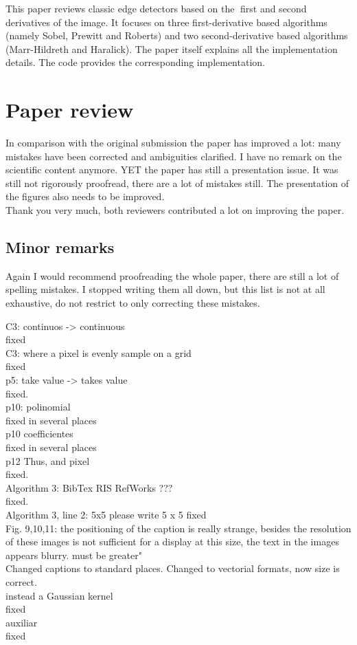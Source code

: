 \documentclass[a4paper,10pt]{report}
\begin{document}
\que This paper reviews classic edge detectors based on the first and second derivatives of the image. It focuses
on three first-derivative based algorithms (namely Sobel, Prewitt and Roberts) and two second-derivative
based algorithms (Marr-Hildreth and Haralick). The paper itself explains all the implementation details.
The code provides the corresponding implementation.\\

\section{Paper review}

\que In comparison with the original submission the paper has improved a lot: many mistakes have been corrected
and ambiguities clarified. I have no remark on the scientific content anymore. YET the paper has still a
presentation issue. It was still not rigorously proofread, there are a lot of mistakes still. The presentation of the figures also needs to be improved.\\

\ans Thank you very much, both reviewers contributed a lot on improving the paper.

\subsection{Minor remarks}
 Again I would recommend proofreading the whole paper, there are still a lot of spelling
mistakes. I stopped writing them all down, but this list is not at all exhaustive, do not restrict to only
correcting these mistakes.

\que C3: continuos -> continuous\\
\ans fixed\\
\que C3: where a pixel is evenly sample on a grid \\
\ans fixed\\
\que p5: take value -> takes value \\
\ans fixed.\\
\que  p10: polinomial \\
\ans fixed in several places\\
\que p10 coefficientes \\
\ans fixed in several places\\
\que p12 Thus, and pixel\\
\ans fixed.\\
\que Algorithm 3: BibTex RIS RefWorks ???\\
\ans fixed.\\
\que Algorithm 3, line 2: 5x5 please write 5 x 5
\ans fixed\\
\que Fig. 9,10,11: the positioning of the caption is really strange, besides the resolution of these images is not sufficient for a display at this size, the text in the images appears blurry. must be greater"\\
\ans Changed captions to standard places. Changed to vectorial formats, now size is correct.\\
\que instead a Gaussian kernel\\
\ans fixed\\
\que auxiliar\\
\ans fixed\\
\end{document}
